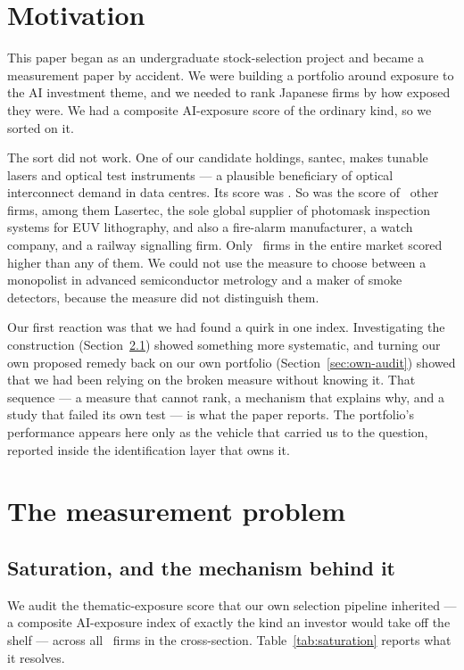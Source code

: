 \documentclass[a4paper,11pt]{article}
\begin{document}
\section{Motivation}\label{sec:motivation}

This paper began as an undergraduate stock-selection project and became a measurement paper by
accident. We were building a portfolio around exposure to the AI investment theme, and we needed to
rank Japanese firms by how exposed they were. We had a composite AI-exposure score of the ordinary
kind, so we sorted on it.

The sort did not work. One of our candidate holdings, santec, makes tunable lasers and optical test
instruments --- a plausible beneficiary of optical interconnect demand in data centres. Its score was
\SatTieValue. So was the score of \SatTieN\ other firms, among them Lasertec, the sole global supplier
of photomask inspection systems for EUV lithography, and also a fire-alarm manufacturer, a watch
company, and a railway signalling firm. Only \SatAbove\ firms in the entire market scored higher than
any of them. We could not use the measure to choose between a monopolist in advanced semiconductor
metrology and a maker of smoke detectors, because the measure did not distinguish them.

Our first reaction was that we had found a quirk in one index. Investigating the construction
(Section~\ref{sec:saturation}) showed something more systematic, and turning our own proposed
remedy back on our own portfolio (Section~\ref{sec:own-audit}) showed that we had been relying on the
broken measure without knowing it. That sequence --- a measure that cannot rank, a mechanism that
explains why, and a study that failed its own test --- is what the paper reports. The portfolio's
performance appears here only as the vehicle that carried us to the question, reported inside the
identification layer that owns it.

\section{The measurement problem}\label{sec:measurement}

\subsection{Saturation, and the mechanism behind it}\label{sec:saturation}

We audit the thematic-exposure score that our own selection pipeline inherited --- a composite
AI-exposure index of exactly the kind an investor would take off the shelf --- across all
\SatFirms\ firms in the cross-section. Table~\ref{tab:saturation} reports what it resolves.
\end{document}
